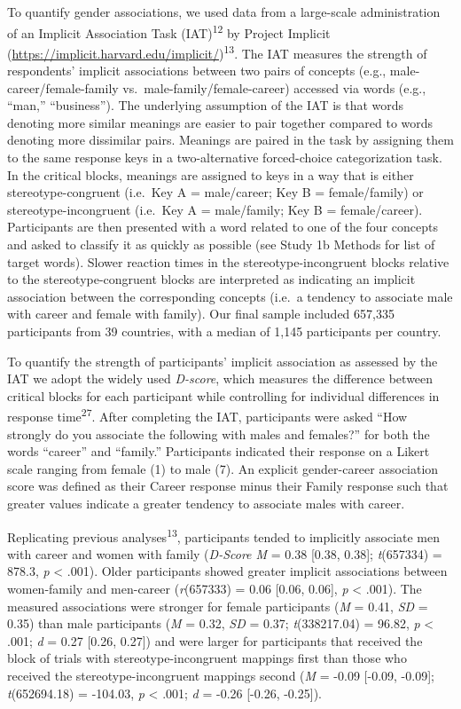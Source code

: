\documentclass[9pt,twocolumn]{pnas-new}
\begin{document}
To quantify gender associations, we used data from a large-scale administration of an Implicit Association Task (IAT)\textsuperscript{12}  by Project Implicit (\url{https://implicit.harvard.edu/implicit/})\textsuperscript{13}. The IAT measures the strength of respondents' implicit associations between two pairs of concepts (e.g., male-career/female-family vs.~male-family/female-career) accessed via
words (e.g., \enquote{man,} \enquote{business}). The underlying
assumption of the IAT is that words denoting more similar meanings
are easier to pair together compared to words denoting more dissimilar pairs. Meanings are paired in the task by assigning them to the same response
keys in a two-alternative forced-choice categorization task. In the
critical blocks, meanings are assigned to keys in a way that
is either stereotype-congruent (i.e.~Key A = male/career; Key B =
female/family) or stereotype-incongruent (i.e.~Key A = male/family; Key B =
female/career). Participants are then presented with a word related to
one of the four concepts and asked to classify it as quickly as possible
(see Study 1b Methods for list of target words). Slower reaction times
in the stereotype-incongruent blocks relative to the stereotype-congruent blocks are
interpreted as indicating an implicit association between the
corresponding concepts (i.e.~a tendency to associate male with career and
female with family). Our final sample included 657,335 participants from 39 countries, with a
median of 1,145 participants per country.

To quantify the strength of participants’ implicit association as assessed by the IAT we adopt the widely used  \emph{D-score}, which measures the difference between critical blocks for each participant while controlling for individual differences
in response time\textsuperscript{27}. After completing
the IAT, participants were asked \enquote{How strongly do you associate
the following with males and females?} for both the words
\enquote{career} and \enquote{family.} Participants indicated their
response on a Likert scale ranging from female (1) to male
(7). An explicit gender-career association score was defined as their Career response minus their Family response such that greater values indicate a greater tendency to associate males with career.

Replicating previous analyses\textsuperscript{13}, participants tended to implicitly associate men with career and women with family (\emph{D-Score M} = 0.38 {[}0.38, 0.38{]}; \emph{t}(657334) = 878.3, \emph{p} \textless{} .001). Older participants showed greater implicit associations between women-family and men-career  (\emph{r}(657333) = 0.06 {[}0.06, 0.06{]}, \emph{p} \textless{} .001).  The measured associations were stronger for female participants (\emph{M} = 0.41, \emph{SD} = 0.35) than male participants
(\emph{M} = 0.32, \emph{SD} = 0.37; \emph{t}(338217.04) = 96.82, \emph{p} \textless{} .001; \emph{d} = 0.27 {[}0.26, 0.27{]}) and were larger for participants that received the block of trials with stereotype-incongruent mappings first than those who received the stereotype-incongruent mappings second (\emph{M} = -0.09 {[}-0.09, -0.09{]}; \emph{t}(652694.18) = -104.03, \emph{p} \textless{} .001; \emph{d} = -0.26 {[}-0.26, -0.25{]}). 
\end{document}
